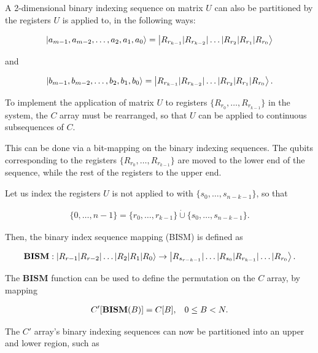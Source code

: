 A 2-dimensional binary indexing sequence on matrix $U$ can also be partitioned by the registers $U$ is applied to, in the following ways:

\begin{align*}
\ket{a_{m-1},a_{m-2},\dots{},a_2,a_1,a_0} = \ket{R_{r_{k-1}} | R_{r_{k-2}} | \dots{} | R_{r_2} | R_{r_1} | R_{r_0}}
\end{align*}

and

\begin{align*}
\ket{b_{m-1},b_{m-2},\dots{},b_2,b_1,b_0} = \ket{R_{r_{k-1}} | R_{r_{k-2}} | \dots{} | R_{r_2} | R_{r_1} | R_{r_0}}.
\end{align*}

To implement the application of matrix $U$ to registers $\{R_{r_0},\dots{},R_{r_{k-1}}\}$ in the system, the $C$ array must be rearranged, so that $U$ can be applied to continuous subsequences of $C$.

This can be done via a bit-mapping on the binary indexing sequences. The qubits corresponding to the registers $\{R_{r_0},\dots{},R_{r_{k-1}}\}$ are moved to the lower end of the sequence, while the rest of the registers to the upper end.

Let us index the registers $U$ is not applied to with $\{s_0, \dots{}, s_{n-k-1}\}$, so that

\begin{align*}
\{0, \dots{}, n-1\} = \{r_0, \dots{}, r_{k-1}\} \dot{\cup} \{s_0, \dots{}, s_{n-k-1}\}. 
\end{align*}

Then, the binary index sequence mapping (BISM) is defined as

\begin{align*}
\text{\textbf{BISM}}: \ket{R_{r-1} | R_{r-2} | \dots{} | R_2 | R_1 | R_0} \rightarrow \ket{R_{s_{r-k-1}} | \dots{} | R_{s_0} \mathbf{|} R_{r_{k-1}} | \dots{} | R_{r_0} }.
\end{align*}

The \textbf{BISM} function can be used to define the permutation on the $C$ array, by mapping

\begin{align*}
C'[\text{\textbf{BISM}}(B)] = C[B], \hspace{3mm}0\leq{}B<N.
\end{align*}

The $C'$ array's binary indexing sequences can now be partitioned into an upper and lower region, such as

